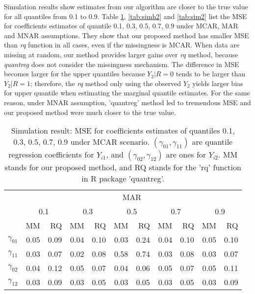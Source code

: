 \documentclass[12pt]{article}
\begin{document}
Simulation results show estimates from our algorithm are closer to the
true value for all quantiles from 0.1 to 0.9. Table \ref{tab:sim},
\ref{tab:simh2} and \ref{tab:sim2} list the MSE for coefficients
estimates of quantile 0.1, 0.3, 0.5, 0.7, 0.9 under MCAR, MAR and MNAR
assumptions.  They show that our proposed method has smaller MSE than
\textit{rq} function in all cases, even if the missingness is
MCAR. When data are missing at random, our method provides larger
gains over \textit{rq} method, because \textit{quantreg} does not
consider the missingness mechanism. The difference in MSE becomes
larger for the upper quantiles because $Y_2 |R = 0$ tends to be larger
than $Y_2 | R = 1$; therefore, the \textit{rq} method only using the
observed $Y_2$ yields larger bias for upper quantile when estimating
the marginal quantile estimates.  For the same reason, under MNAR
assumption, 'quantreg' method led to tremendous MSE and our proposed
method were much closer to the true value.

\begin{table}
  \renewcommand{\arraystretch}{1.3}
  \centering
  \caption{Simulation result: MSE for coefficients estimates of quantiles
    0.1, 0.3, 0.5, 0.7, 0.9 under MCAR scenario. $(\gamma_{01}, \gamma_{11})$
    are quantile regression coefficients for $Y_{i1}$, and $(\gamma_{02}, \gamma_{12})$
    are ones for $Y_{i2}$. MM stands for our proposed method, and RQ stands for the 'rq'
    function in R package 'quantreg'.}
  \vspace{10pt}
  \begin{tabular}{rrrrrrrrrrr}
    \toprule
    & \multicolumn{ 10}{c}{MAR} \\
    \cline{2-11}
    &  \multicolumn{2}{c}{0.1} &  \multicolumn{2}{c}{0.3} &  \multicolumn{2}{c}{0.5}
    &  \multicolumn{2}{c}{0.7} &  \multicolumn{2}{c}{0.9} \\
    \cline{2-11}
    & MM & RQ    & MM & RQ    & MM & RQ    & MM & RQ    & MM & RQ \\
    \hline
    $\gamma_{01}$ &  0.05 &0.09& 0.04  &0.10 &0.03 &0.24 &0.04 &0.10 &0.05 &0.10 \\
    $\gamma_{11}$ &  0.03 &0.07&  0.02 &0.08 &0.58 &0.74 &0.03 &0.08 &0.03 &0.07 \\
    $\gamma_{02}$ & 0.04  &0.12&  0.05 &0.07 &0.04 &0.06 &0.05 &0.07 &0.05 &0.11 \\
    $\gamma_{12}$ &  0.03 & 0.09& 0.03 &0.05 &0.03 &0.05 &0.03 &0.05 &0.03 &0.09 \\
    \bottomrule
  \end{tabular}  \label{tab:sim}
\end{table}
\end{document}
